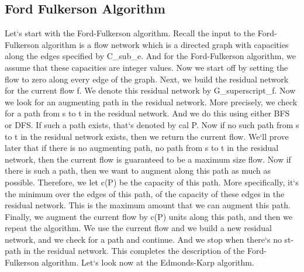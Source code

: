\subsection{Ford Fulkerson Algorithm}
Let`s start with the Ford-Fulkerson algorithm.
Recall the input to the Ford-Fulkerson algorithm is a flow network which is a directed graph with capacities along the edges specified by C\_sub\_e.
And for the Ford-Fulkerson algorithm, we assume that these capacities are integer values.
Now we start off by setting the flow to zero along every edge of the graph.
Next, we build the residual network for the current flow f.
We denote this residual network by G\_superscript\_f.
Now we look for an augmenting path in the residual network.
More precisely, we check for a path from s to t in the residual network.
And we do this using either BFS or DFS\@.
If such a path exists, that`s denoted by cal P\@.
Now if no such path from s to t in the residual network exists, then we return the current flow.
We`ll prove later that if there is no augmenting path, no path from s to t in the residual network, then the current flow is guaranteed to be a maximum size flow.
Now if there is such a path, then we want to augment along this path as much as possible.
Therefore, we let c(P) be the capacity of this path.
More specifically, it`s the minimum over the edges of this path, of the capacity of these edges in the residual network.
This is the maximum amount that we can augment this path.
Finally, we augment the current flow by c(P) units along this path, and then we repeat the algorithm.
We use the current flow and we build a new residual network, and we check for a path and continue.
And we stop when there`s no st-path in the residual network.
This completes the description of the Ford-Fulkerson algorithm.
Let`s look now at the Edmonds-Karp algorithm.

